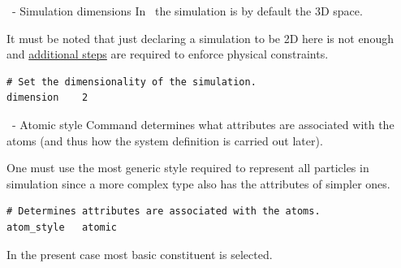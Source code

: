 \begin{frame}[fragile]{\secname}{\subsecname\ - Simulation dimensions}
In \LAMMPS\, the simulation  is by default the 3D space.

\vspace{0.5cm}

It must be noted that just declaring a simulation to be 2D here is not enough and \href{https://docs.lammps.org/Howto_2d.html}{additional steps} are required to enforce physical constraints.

\vspace{0.5cm}

\begin{lstlisting}[language=LAMMPS,basicstyle=\small]
# Set the dimensionality of the simulation.
dimension    2
\end{lstlisting}
\end{frame}

\begin{frame}[fragile]{\secname}{\subsecname\ - Atomic style}
Command  determines what attributes are associated with the atoms (and thus how the system definition is carried out later).

\vspace{0.5cm}

One must use the most generic style required to represent all particles in simulation since a more complex type also has the attributes of simpler ones.

\vspace{0.5cm}

\begin{lstlisting}[language=LAMMPS,basicstyle=\small]
# Determines attributes are associated with the atoms.
atom_style   atomic
\end{lstlisting}

\vspace{0.5cm}
In the present case most basic constituent  is selected.
\end{frame}

